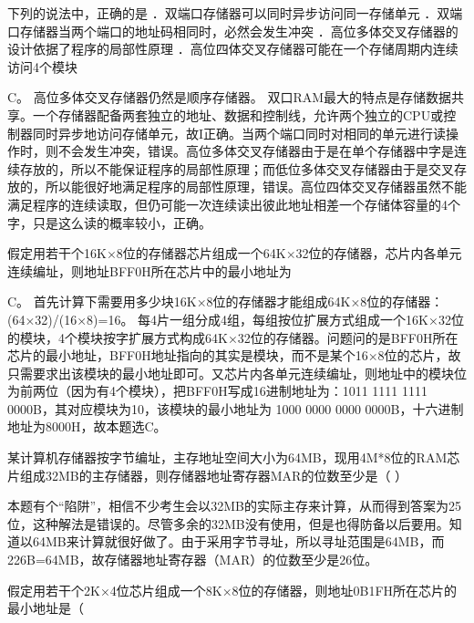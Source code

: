 \question 下列的说法中，正确的是 ．双端口存储器可以同时异步访问同一存储单元
．双端口存储器当两个端口的地址码相同时，必然会发生冲突
．高位多体交叉存储器的设计依据了程序的局部性原理
．高位四体交叉存储器可能在一个存储周期内连续访问4个模块
\par{}
\begin{solution}C。 高位多体交叉存储器仍然是顺序存储器。
双口RAM最大的特点是存储数据共享。一个存储器配备两套独立的地址、数据和控制线，允许两个独立的CPU或控制器同时异步地访问存储单元，故I正确。当两个端口同时对相同的单元进行读操作时，则不会发生冲突，错误。高位多体交叉存储器由于是在单个存储器中字是连续存放的，所以不能保证程序的局部性原理；而低位多体交叉存储器由于是交叉存放的，所以能很好地满足程序的局部性原理，错误。高位四体交叉存储器虽然不能满足程序的连续读取，但仍可能一次连续读出彼此地址相差一个存储体容量的4个字，只是这么读的概率较小，正确。
\end{solution}
\question 假定用若干个16K×8位的存储器芯片组成一个64K×32位的存储器，芯片内各单元连续编址，则地址BFF0H所在芯片中的最小地址为
\par{}
\begin{solution}C。 首先计算下需要用多少块16K×8位的存储器才能组成64K×8位的存储器：
(64×32)/(16×8)=16。
每4片一组分成4组，每组按位扩展方式组成一个16K×32位的模块，4个模块按字扩展方式构成64K×32位的存储器。问题问的是BFF0H所在芯片的最小地址，BFF0H地址指向的其实是模块，而不是某个16×8位的芯片，故只需要求出该模块的最小地址即可。又芯片内各单元连续编址，则地址中的模块位为前两位（因为有4个模块），把BFF0H写成16进制地址为：1011
1111 1111 0000B，其对应模块为10，该模块的最小地址为 1000 0000 0000
0000B，十六进制地址为8000H，故本题选C。
\end{solution}
\question 某计算机存储器按字节编址，主存地址空间大小为64MB，现用4M*8位的RAM芯片组成32MB的主存储器，则存储器地址寄存器MAR的位数至少是（
）
\par{}
\begin{solution}本题有个``陷阱''，相信不少考生会以32MB的实际主存来计算，从而得到答案为25位，这种解法是错误的。尽管多余的32MB没有使用，但是也得防备以后要用。知道以64MB来计算就很好做了。由于采用字节寻址，所以寻址范围是64MB，而226B=64MB，故存储器地址寄存器（MAR）的位数至少是26位。
\end{solution}
\question 假定用若干个2K×4位芯片组成一个8K×8位的存储器，则地址0B1FH所在芯片的最小地址是（
